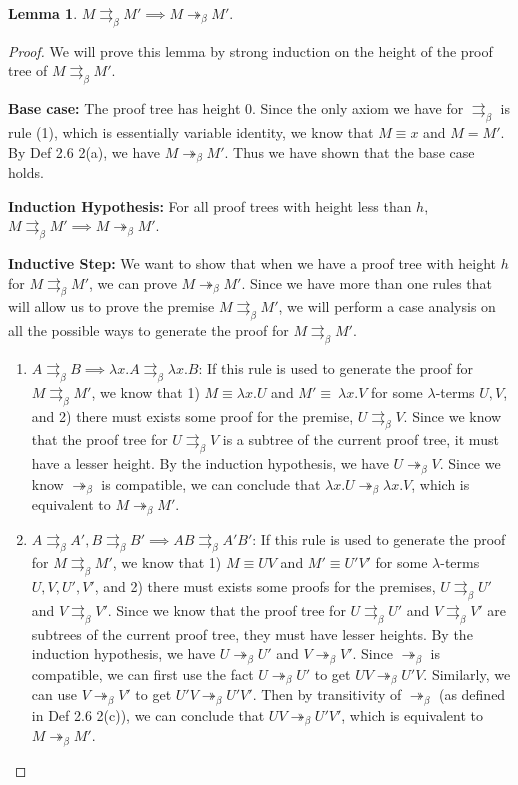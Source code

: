 \documentclass[a4paper,11pt]{article}
\theoremstyle{definition}
\theoremstyle{example}
\theoremstyle{lemma}
\newtheorem{lemma}{Lemma}
\newcommand{\lamterm}[2]{\lambda #1. #2}
\newcommand{\msbr}{\twoheadrightarrow_{\beta}}
\newcommand{\pbr}{\rightrightarrows_{\beta}}
\begin{document}
\begin{lemma}
$M \pbr M' \implies M \msbr M'$.
\end{lemma}
\begin{proof}
We will prove this lemma by strong induction on the height of the proof tree of $M \pbr M'$.

\textbf{Base case: }The proof tree has height $0$. Since the only axiom we have for $\pbr$ is rule (1), which is essentially variable identity, we know that $M \equiv x$ and $M = M'$. By Def 2.6 2(a), we have $M \msbr M'$. Thus we have shown that the base case holds.

\textbf{Induction Hypothesis: }For all proof trees with height less than $h$, $M \pbr M' \implies M \msbr M'$.

\textbf{Inductive Step: }We want to show that when we have a proof tree with height $h$ for $M \pbr M'$, we can prove $M \msbr M'$. Since we have more than one rules that will allow us to prove the premise $M \pbr M'$, we will perform a case analysis on all the possible ways to generate the proof for $M \pbr M'$.
\begin{enumerate}[topsep=2pt,itemsep=-0.5ex,partopsep=1ex,parsep=1ex]
    \item $A \pbr B \implies \lamterm{x}{A} \pbr \lamterm{x}{B}$: If this rule is used to generate the proof for $M \pbr M'$, we know that 1) $M \equiv \lamterm{x}{U}$ and $M' \equiv \
    \lamterm{x}{V}$ for some $\lambda$-terms $U,V$, and 2) there must exists some proof for the premise, $U \pbr V$. Since we know that the proof tree for $U \pbr V$ is a subtree of the current proof tree, it must have a lesser height. By the induction hypothesis, we have $U \msbr V$. Since we know $\msbr$ is compatible, we can conclude that $\lamterm{x}{U} \msbr \lamterm{x}{V}$, which is equivalent to $M \msbr M'$.
    \item $A \pbr A', B \pbr B' \implies AB \pbr A'B'$: If this rule is used to generate the proof for $M \pbr M'$, we know that 1) $M \equiv UV$ and $M' \equiv U'V'$ for some $\lambda$-terms $U, V, U', V'$, and 2) there must exists some proofs for the premises, $U \pbr U'$ and $V \pbr V'$. Since we know that the proof tree for $U \pbr U'$ and $V \pbr V'$ are subtrees of the current proof tree, they must have lesser heights. By the induction hypothesis, we have $U \msbr U'$ and $V \msbr V'$. Since $\msbr$ is compatible, we can first use the fact $U \msbr U'$ to get $UV \msbr U'V$. Similarly, we can use $V \msbr V'$ to get $U'V \msbr U'V'$. Then by transitivity of $\msbr$ (as defined in Def 2.6 2(c)), we can conclude that $UV \msbr U'V'$, which is equivalent to $M \msbr M'$.

\end{enumerate}
\end{proof}
\end{document}
